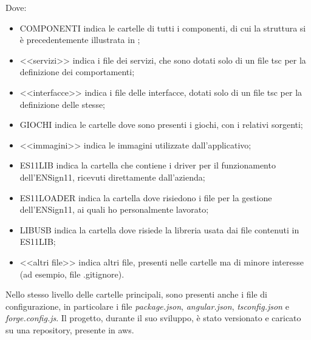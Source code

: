 Dove:
\begin{itemize}
    \item COMPONENTI indica le cartelle di tutti i componenti, di cui la struttura si è precedentemente illustrata in ;
    \item <<servizi>> indica i file dei servizi, che sono dotati solo di un file \Gls{tsc} per la definizione dei comportamenti;
    \item <<interfacce>> indica i file delle interfacce, dotati solo di un file \Gls{tsc} per la definizione delle stesse;
    \item GIOCHI indica le cartelle dove sono presenti i giochi, con i relativi sorgenti;
    \item <<immagini>> indica le immagini utilizzate dall'applicativo;
    \item ES11LIB indica la cartella che contiene i driver per il funzionamento dell'ENSign11, ricevuti direttamente dall'azienda;
    \item ES11LOADER indica la cartella dove risiedono i file per la gestione dell'ENSign11, ai quali ho personalmente lavorato;
    \item LIBUSB indica la cartella dove risiede la libreria usata dai file contenuti in ES11LIB;
    \item <<altri file>> indica altri file, presenti nelle cartelle ma di minore interesse (ad esempio, file .gitignore).
\end{itemize}
Nello stesso livello delle cartelle principali, sono presenti anche i file di configurazione, in particolare i file \emph{package.json}, \emph{angular.json}, \emph{tsconfig.json} e \emph{forge.config.js}.
Il progetto, durante il suo sviluppo, è stato versionato e caricato su una repository, presente in \gls{aws}.